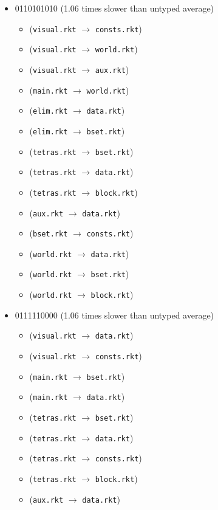 \documentclass{article}
\newcommand{\mono}[1]{\texttt{#1}}
\begin{document}
\begin{itemize}
\begin{itemize}
  \end{itemize}
\item 0110101010 (1.06 times slower than untyped average)
  \begin{itemize}
  \item (\mono{visual.rkt} $\rightarrow$ \mono{consts.rkt})
  \item (\mono{visual.rkt} $\rightarrow$ \mono{world.rkt})
  \item (\mono{visual.rkt} $\rightarrow$ \mono{aux.rkt})
  \item (\mono{main.rkt} $\rightarrow$ \mono{world.rkt})
  \item (\mono{elim.rkt} $\rightarrow$ \mono{data.rkt})
  \item (\mono{elim.rkt} $\rightarrow$ \mono{bset.rkt})
  \item (\mono{tetras.rkt} $\rightarrow$ \mono{bset.rkt})
  \item (\mono{tetras.rkt} $\rightarrow$ \mono{data.rkt})
  \item (\mono{tetras.rkt} $\rightarrow$ \mono{block.rkt})
  \item (\mono{aux.rkt} $\rightarrow$ \mono{data.rkt})
  \item (\mono{bset.rkt} $\rightarrow$ \mono{consts.rkt})
  \item (\mono{world.rkt} $\rightarrow$ \mono{data.rkt})
  \item (\mono{world.rkt} $\rightarrow$ \mono{bset.rkt})
  \item (\mono{world.rkt} $\rightarrow$ \mono{block.rkt})
  \end{itemize}
\item 0111110000 (1.06 times slower than untyped average)
  \begin{itemize}
  \item (\mono{visual.rkt} $\rightarrow$ \mono{data.rkt})
  \item (\mono{visual.rkt} $\rightarrow$ \mono{consts.rkt})
  \item (\mono{main.rkt} $\rightarrow$ \mono{bset.rkt})
  \item (\mono{main.rkt} $\rightarrow$ \mono{data.rkt})
  \item (\mono{tetras.rkt} $\rightarrow$ \mono{bset.rkt})
  \item (\mono{tetras.rkt} $\rightarrow$ \mono{data.rkt})
  \item (\mono{tetras.rkt} $\rightarrow$ \mono{consts.rkt})
  \item (\mono{tetras.rkt} $\rightarrow$ \mono{block.rkt})
  \item (\mono{aux.rkt} $\rightarrow$ \mono{data.rkt})

\end{itemize}
\end{itemize}
\end{document}
